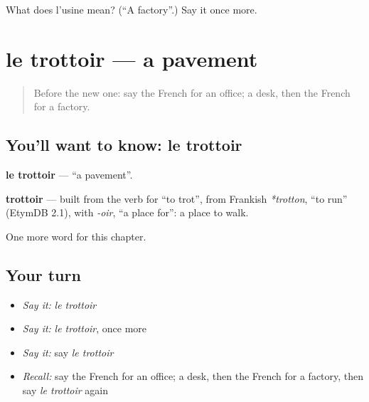 \begin{tcolorbox}[breakable,colback=teal!4,colframe=teal!35!black,title={Before you move on}]
What does l'usine mean? (\textquotedblleft{}A factory\textquotedblright{}.) Say it once more.
\end{tcolorbox}
\section[le trottoir]{le trottoir — a pavement}

\label{lesson:FR-C108-trottoir}



\begin{quote}
Before the new one: say the French for an office; a desk, then the French for a factory.
\end{quote}

\subsection*{You'll want to know: le trottoir}
\textbf{le trottoir} — \textquotedblleft{}a pavement\textquotedblright{}.

\begin{cousinweb}
\textbf{trottoir} — built from the verb for \textquotedblleft{}to trot\textquotedblright{}, from Frankish \emph{*trotton}, \textquotedblleft{}to run\textquotedblright{} (EtymDB 2.1), with \emph{-oir}, \textquotedblleft{}a place for\textquotedblright{}: a place to walk.
\end{cousinweb}

\begin{grammarlens}[title={What you've built}]
One more word for this chapter.
\end{grammarlens}

\subsection*{Your turn}
\begin{itemize}
\raggedright
  \item \emph{Say it:} \emph{le trottoir}
  \item \emph{Say it:} \emph{le trottoir}, once more
  \item \emph{Say it:} say \emph{le trottoir}
  \item \emph{Recall:} say the French for an office; a desk, then the French for a factory, then say \emph{le trottoir} again
\end{itemize}

